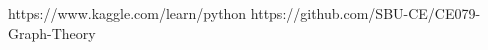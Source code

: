 \documentclass{article}
\begin{document}
\begin{thebibliography}{99} %


\begin{LTRitems}

\resetlatinfont

 https://www.kaggle.com/learn/python
 https://github.com/SBU-CE/CE079-Graph-Theory

\end{LTRitems}

\end{thebibliography}
\end{document}
